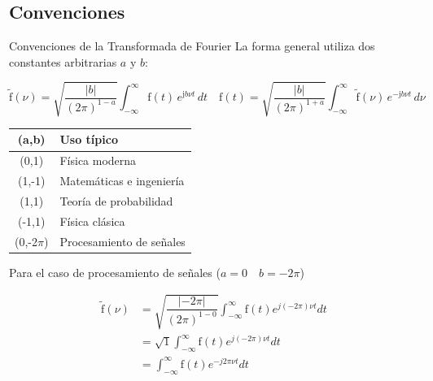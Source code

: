 \documentclass[aspectratio=169]{beamer}
\newcommand{\imag}{\mathrm{j}}
\newcommand{\frtP}[1]{\tilde{\text{f}}\left(#1\right)}
\newcommand{\frtnP}[1]{\text{f}\left(#1\right)}
\begin{document}
\subsection{Convenciones}
\begin{frame}{Convenciones de la Transformada de Fourier}
La forma general utiliza dos constantes arbitrarias $a$ y $b$:

\begin{equation*}
\frtP{\nu} = \sqrt{\dfrac{|b|}{(2\pi)^{1-a}}}\int_{-\infty}^{\infty} \text{f}(t)\, e^{\imag b\nu t}\, dt
\quad
\frtnP{t} = \sqrt{\dfrac{|b|}{(2\pi)^{1+a}}}\int_{-\infty}^{\infty} \frtP{\nu}\, e^{-\imag b\nu t}\, d\nu
\end{equation*}

 \begin{table}
   \centering
   \small
   \begin{tabular}{c|l}
     \hline
     \textbf{(a,b)} & \textbf{Uso típico} \\
     \hline
     (0,1) & Física moderna \\
     (1,-1) & Matemáticas e ingeniería \\
     (1,1) & Teoría de probabilidad \\
     (-1,1) & Física clásica \\
     (0,-2$\pi$) & Procesamiento de señales \\
     \hline
   \end{tabular}
 \end{table}
Para el caso de procesamiento de señales ($a=0 \quad b= -2 \pi$)


\begin{equation*}
\begin{aligned}
\frtP{\nu}
&= \sqrt{\dfrac{|-2\pi|}{(2\pi)^{1-0}}}\int_{-\infty}^{\infty} \frtnP{t}e^{j(-2\pi)\nu t}dt \\
&= \sqrt{1}\int_{-\infty}^{\infty} \frtnP{t}e^{j(-2\pi)\nu t}dt \\
&= \boxed{\int_{-\infty}^{\infty} \frtnP{t}e^{-j2\pi\nu t}dt}\\
\end{aligned}
\end{equation*}

\end{frame}
\end{document}
